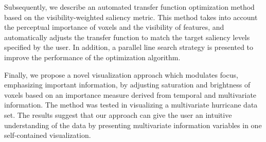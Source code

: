 \documentclass[a4paper, 12pt, oneside]{report}         %
\begin{document}
\begin{thesisabstract}
Subsequently, we describe an automated transfer function optimization method based on the visibility-weighted saliency metric. This method takes into account the perceptual importance of voxels and the visibility of features, and automatically adjusts the transfer function to match the target saliency levels specified by the user. In addition, a parallel line search strategy is presented to improve the performance of the optimization algorithm.

Finally, we propose a novel visualization approach which modulates focus, emphasizing important information, by adjusting saturation and brightness of voxels based on an importance measure derived from temporal and multivariate information.
The method was tested in visualizing a multivariate hurricane data set. The results suggest that our approach can give the user an intuitive understanding of the data by presenting multivariate information variables in one self-contained visualization.



\end{thesisabstract}
\end{document}
